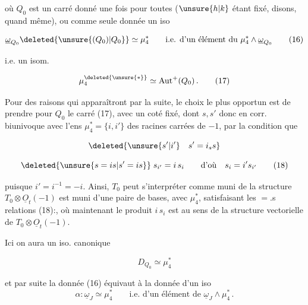 
où $Q_0$ est un carré donné une fois pour toutes ($\unsure{h|k}$ étant fixé, disons, quand même), ou comme seule donnée un iso

\[
\underline{\omega}_{Q_0}\deleted{\unsure{(Q_0)|Q_0}}\simeq\mu_4^*
\qquad\text{i.e. d'un élément du }\mu_4^*\wedge\underline{\omega}_{Q_0}
\tag*{(16)}
\]

i.e. un isom.

\[
\mu_4^{\deleted{\unsure{*}}}\simeq\mathrm{Aut}^+(Q_0)\,.
\tag*{(17)}
\]

Pour des raisons qui apparaîtront par la suite, le choix le plus opportun est de prendre pour $Q_0$ le carré   (17), avec un coté fixé, dont   $s,s'$  donc en corr. biunivoque avec l'ens $\mu_4^*=\{i,i'\}$ des racines carrées de $-1$, par la condition que


\[
\deleted{\unsure{s'|i'}\quad s'=i_s s}
\]

\[
\deleted{\unsure{s=is|s'=is}}\;s_{i'}=i\,s_i\qquad\text{d'où}\quad s_i=i's_{i'}
\tag*{(18)}
\]

puisque $i'=i^{-1}=-i$. Ainsi, $T_0$ peut s'interpréter comme muni de la structure   $T_0\otimes\underline{O}_{t}(-1)$ est muni d'une paire de bases,   avec $\mu_4^*$, satisfaisant les $=$.s relations (18):, où maintenant le produit $i\,s_i$ est au sens de la structure vectorielle de $T_0\otimes\underline O_t(-1)$. 

Ici on aura un iso. canonique

\[
D_{Q_0}\simeq\mu_4^*
\tag*{(19)}
\]

et par suite la donnée (16) équivaut à la donnée d'un iso
\[
\alpha:\underline{\omega}_J\simeq\mu_4^*
\qquad\text{i.e. d'un élément de }\underline{\omega}_J\wedge\mu_4^*\,.
\tag*{(20)}
\]

